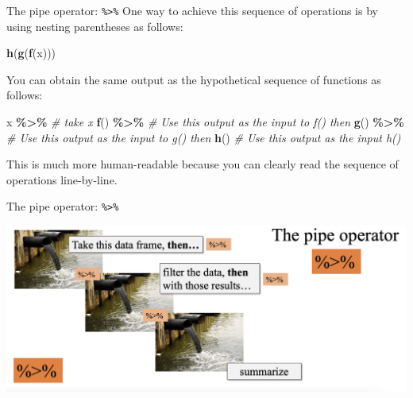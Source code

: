 \documentclass[
  ignorenonframetext,
]{beamer}
\newenvironment{Shaded}{\begin{snugshade}}{\end{snugshade}}
\newcommand{\CommentTok}[1]{\textcolor[rgb]{0.56,0.35,0.01}{\textit{#1}}}
\newcommand{\FunctionTok}[1]{\textcolor[rgb]{0.13,0.29,0.53}{\textbf{#1}}}
\newcommand{\NormalTok}[1]{#1}
\newcommand{\SpecialCharTok}[1]{\textcolor[rgb]{0.81,0.36,0.00}{\textbf{#1}}}
\begin{document}
\begin{frame}[fragile]{The pipe operator: \texttt{\%\textgreater{}\%}}
\protect\hypertarget{the-pipe-operator-1}{}
One way to achieve this sequence of operations is by using nesting
parentheses as follows:

\normalsize

\begin{Shaded}
\begin{Highlighting}[]
\FunctionTok{h}\NormalTok{(}\FunctionTok{g}\NormalTok{(}\FunctionTok{f}\NormalTok{(x)))}
\end{Highlighting}
\end{Shaded}

\normalsize

You can obtain the same output as the hypothetical sequence of functions
as follows:

\normalsize

\begin{Shaded}
\begin{Highlighting}[]
\NormalTok{x }\SpecialCharTok{\%\textgreater{}\%}       \CommentTok{\# take x}
  \FunctionTok{f}\NormalTok{() }\SpecialCharTok{\%\textgreater{}\%}   \CommentTok{\# Use this output as the input to f() then}
  \FunctionTok{g}\NormalTok{() }\SpecialCharTok{\%\textgreater{}\%}   \CommentTok{\# Use this output as the input to g() then}
  \FunctionTok{h}\NormalTok{()       }\CommentTok{\# Use this output as the input h()}
\end{Highlighting}
\end{Shaded}

\normalsize

This is much more human-readable because you can clearly read the
sequence of operations line-by-line.
\end{frame}

\begin{frame}{The pipe operator: \texttt{\%\textgreater{}\%}}
\protect\hypertarget{the-pipe-operator-2}{}
\begin{center}\includegraphics[width=0.8\linewidth,height=0.6\textheight]{week3_9} \end{center}
\end{frame}
\end{document}
